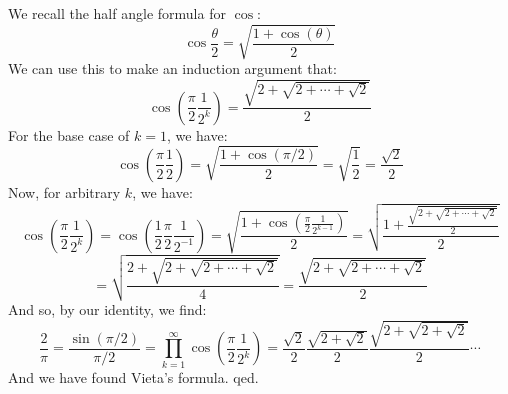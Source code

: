 \documentclass[12pt,a4paper]{article}
\newcommand{\1}[1]{\mathbbm{1}\left\{ #1 \right\}}
\begin{document}
We recall the half angle formula for $\cos$:
$$
	\cos \frac{\theta}{2} = \sqrt{\frac{1 + \cos(\theta)}{2}}
$$
We can use this to make an induction argument that:
$$
	\cos\left(\frac{\pi}{2} \frac{1}{2^k}\right) = \frac{\sqrt{2 + \sqrt{2 + \cdots + \sqrt{2}}}}{2}
$$
For the base case of $k = 1$, we have:
$$
	\cos\left(\frac{\pi}{2} \frac{1}{2}\right) = \sqrt{\frac{1 + \cos(\pi/2)}{2}} = \sqrt{\frac{1}{2}} = \frac{\sqrt{2}}{2}
$$
Now, for arbitrary $k$, we have:
$$
	\cos\left(\frac{\pi}{2} \frac{1}{2^k}\right) =
	\cos\left(\frac{1}{2}\frac{\pi}{2} \frac{1}{2^{-1}}\right) =
	\sqrt{\frac{1 + \cos\left(\frac{\pi}{2} \frac{1}{2^{k-1}}\right)}{2}} =
	\sqrt{\frac{1 + \frac{\sqrt{2 + \sqrt{2 + \cdots + \sqrt{2}}}}{2}}{2}}
$$
$$
	= \sqrt{\frac{2 + \sqrt{2 + \sqrt{2 + \cdots + \sqrt{2}}}}{4}}
	= \frac{\sqrt{2 + \sqrt{2 + \cdots + \sqrt{2}}}}{2}
$$
And so, by our identity, we find:
$$
	\frac{2}{\pi} = \frac{\sin(\pi/2)}{\pi/2} = \prod_{k=1}^\infty \cos\left(\frac{\pi}{2} \frac{1}{2^k}\right) =
	\frac{\sqrt{2}}{2} \frac{\sqrt{2 + \sqrt{2}}}{2} \frac{\sqrt{2 + \sqrt{2 + \sqrt{2}}}}{2} \cdots 
$$
And we have found Vieta's formula. qed.
\end{document}
